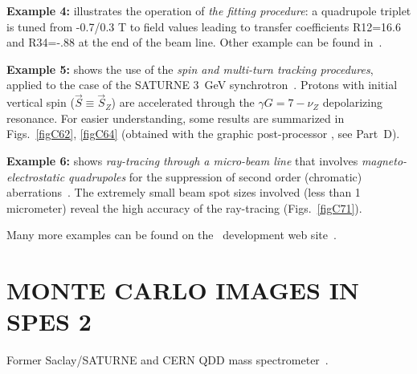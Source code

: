 \bigskip

\noindent\textbf{Example 4:} illustrates the operation of \emph{the fitting
procedure}: a quadrupole triplet is tuned from  -0.7/0.3 T to field values leading to
transfer coefficients  R12=16.6  and R34=-.88  at the end of the beam line.  Other example 
can be found in~\protect\cite{ZgCern}. 

\bigskip


\noindent\textbf{Example 5:} shows the use of the 
\emph{spin and multi-turn tracking procedures}, 
applied to the case of the SATURNE 3~GeV synchrotron~\protect\cite{Biblio3,Biblio7,Grorud}.
 Protons with initial vertical spin  ($\vec S\equiv\vec  S_Z $)  are 
accelerated through the $ \gamma G=7-\nu_ Z $ depolarizing resonance. For 
easier understanding, some results are summarized in Figs.~\ref{figC62}, \ref{figC64} %
(obtained with the graphic post-processor \zpop, see Part~D).

\bigskip 

\noindent\textbf{Example 6:} shows  \emph{ray-tracing through a micro-beam line}
that involves \emph{magneto-electrostatic quadrupoles} for the suppression of 
second order (chromatic) aberrations~\protect\cite{Biblio6}. The extremely small beam 
spot sizes involved (less than 1 micrometer) reveal the high 
accuracy of the ray-tracing (Figs.~\ref{figC71}).   %


\bigskip 

\noindent Many more examples can be found on the \zgoubi\ development web site~\cite{SFZ}.



 \cleardoublepage

\pagestyle{headings}

\section{MONTE CARLO IMAGES IN SPES 2}

\medskip

Former Saclay/SATURNE and CERN QDD mass spectrometer~\cite{Spes2}. 

\vfill

